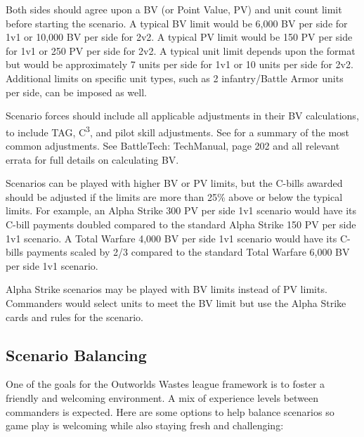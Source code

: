 \documentclass{article}
\begin{document}
Both sides should agree upon a BV (or Point Value, PV) and unit count limit before starting the scenario.
A typical BV limit would be 6,000 BV per side for 1v1 or 10,000 BV per side for 2v2.
A typical PV limit would be 150 PV per side for 1v1 or 250 PV per side for 2v2.
A typical unit limit depends upon the format but would be approximately 7 units per side for 1v1 or 10 units per side for 2v2.
Additional limits on specific unit types, such as 2 infantry/Battle Armor units per side, can be imposed as well.

Scenario forces should include all applicable adjustments in their BV calculations, to include TAG, C\textsuperscript{3}, and pilot skill adjustments.
See \pageref{sec:force_bv_adjustments} for a summary of the most common adjustments.
See BattleTech: TechManual, page 202 and all relevant errata for full details on calculating BV.

Scenarios can be played with higher BV or PV limits, but the C-bills awarded should be adjusted if the limits are more than 25\% above or below the typical limits.
For example, an Alpha Strike 300 PV per side 1v1 scenario would have its C-bill payments doubled compared to the standard Alpha Strike 150 PV per side 1v1 scenario.
A Total Warfare 4,000 BV per side 1v1 scenario would have its C-bills payments scaled by 2/3 compared to the standard Total Warfare 6,000 BV per side 1v1 scenario.

Alpha Strike scenarios may be played with BV limits instead of PV limits.
Commanders would select units to meet the BV limit but use the Alpha Strike cards and rules for the scenario.

\newpage

\subsection{Scenario Balancing}

One of the goals for the Outworlds Wastes league framework is to foster a friendly and welcoming environment.
A mix of experience levels between commanders is expected.
Here are some options to help balance scenarios so game play is welcoming while also staying fresh and challenging:
\end{document}

